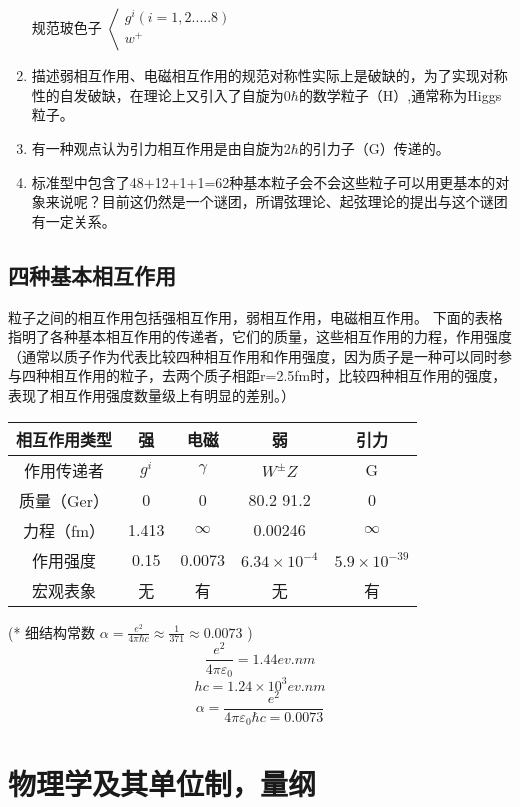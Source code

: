 \begin{enumerate}
 规范玻色子 $\left< \begin{array}{l} g^i(i=1,2.....8)\\ w^+                     \\  \end{array}  \right. $   
\item 
描述弱相互作用、电磁相互作用的规范对称性实际上是破缺的，为了实现对称性的自发破缺，在理论上又引入了自旋为$0\hbar$的数学粒子（H）,通常称为Higgs粒子。  
\item 有一种观点认为引力相互作用是由自旋为2$\hbar$的引力子（G）传递的。  
\item 标准型中包含了48+12+1+1=62种基本粒子会不会这些粒子可以用更基本的对象来说呢？目前这仍然是一个谜团，所谓弦理论、起弦理论的提出与这个谜团有一定关系。  
\end{enumerate}
 \subsection{四种基本相互作用  }
 粒子之间的相互作用包括强相互作用，弱相互作用，电磁相互作用。  
下面的表格指明了各种基本相互作用的传递者，它们的质量，这些相互作用的力程，作用强度（通常以质子作为代表比较四种相互作用和作用强度，因为质子是一种可以同时参与四种相互作用的粒子，去两个质子相距r=2.5fm时，比较四种相互作用的强度，表现了相互作用强度数量级上有明显的差别。）

\begin{center}
 \begin{tabular}{|c|c|c|c|c|}\hline
相互作用类型  &  强  &  电磁&  弱& 引力 \\ \hline
作用传递者   & $ g^i $ & $\gamma $ & $ W^\pm Z $& G  \\   \hline
质量（Ger）  &  0  & 0 &  80.2  91.2 & 0  \\ \hline  
力程（fm）   & 1.413  & $ \infty $ &  0.00246  & $ \infty $  \\ \hline
作用强度     &0.15  & 0.0073  & $ 6.34\times10^{-4} $ &  $5.9\times10^{-39}$ \\  \hline
宏观表象     &无  &  有  &  无&有\\  \hline  
\end{tabular}
\end{center}
  
(*  细结构常数 
$ \alpha=\frac{e^2 }{4 \pi \hbar c } \approx \frac{1}{371}\approx 0.0073$  )    
 \[\frac{e^2}{4 \pi \varepsilon_0}=1.44ev.nm \]
 \[hc=1.24\times10^3ev.nm\]
 \[\alpha=\frac{e^2}{4 \pi \varepsilon_0\hbar c=0.0073}\]
\section{物理学及其单位制，量纲}
  
